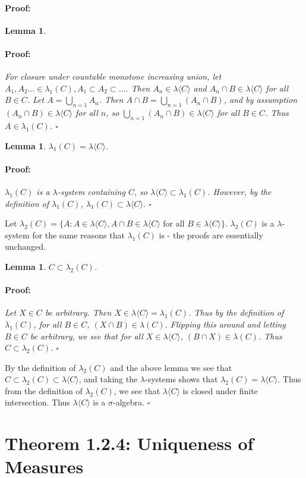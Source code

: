 \documentclass{article}
\newenvironment{proof}{\paragraph{Proof:}}{\hfill$\square$}
\newtheorem{lemma}[theorem]{Lemma}
\begin{document}
\begin{proof}
\begin{lemma}
\begin{proof}
For closure under countable monotone increasing union, let $A_1, A_2 \dots \in \lambda_1(C), A_1 \subset A_2 \subset \dots$. Then $A_n \in \lambda\langle C \rangle$ and $A_n \cap B \in \lambda\langle C \rangle$ for all $B \in C$. Let $A = \bigcup_{n=1} A_n$. Then $A \cap B = \bigcup_{n=1}(A_n \cap B)$, and by assumption $(A_n \cap B) \in \lambda\langle C \rangle$ for all $n$, so $\bigcup_{n=1}(A_n \cap B) \in \lambda\langle C \rangle$ for all $B \in C$. Thus $A \in \lambda_1(C)$.
\end{proof}
\end{lemma}

\begin{lemma}
$\lambda_1(C) = \lambda\langle C \rangle$.
\begin{proof}
$\lambda_1(C)$ is a $\lambda$-system containing $C$, so $\lambda\langle C \rangle \subset \lambda_1(C)$. However, by the definition of $\lambda_1(C)$, $\lambda_1(C) \subset \lambda\langle C \rangle$.
\end{proof}
\end{lemma}
Let $\lambda_2(C) = \{ A:A\in \lambda\langle C \rangle, A\cap B \in \lambda\langle C \rangle \text{ for all } B \in \lambda\langle C \rangle \}$. $\lambda_2(C)$ is a $\lambda$-system for the same reasons that $\lambda_1(C)$ is - the proofs are essentially unchanged.
\begin{lemma}
$C \subset \lambda_2(C)$.
\begin{proof}
Let $X \in C$ be arbitrary. Then $X\in \lambda\langle C \rangle = \lambda_1(C)$. Thus by the definition of $\lambda_1(C)$, for all $B \in C$, $(X \cap B) \in \lambda(C)$. Flipping this around and letting $B \in C$ be arbitrary, we see that for all $X \in \lambda\langle C \rangle$, $(B \cap X) \in \lambda(C)$. Thus $C \subset \lambda_2(C)$.
\end{proof}
\end{lemma}

By the definition of $\lambda_2(C)$ and the above lemma we see that $C \subset \lambda_2(C) \subset \lambda\langle C \rangle$, and taking the $\lambda$-systems shows that $\lambda_2(C) = \lambda\langle C \rangle$. Thus from the definition of $\lambda_2(C)$, we see that $\lambda\langle C \rangle$ is closed under finite intersection. Thus $\lambda\langle C \rangle$ is a $\sigma$-algebra.
\end{proof}

\section*{Theorem 1.2.4: Uniqueness of Measures}
\end{document}

